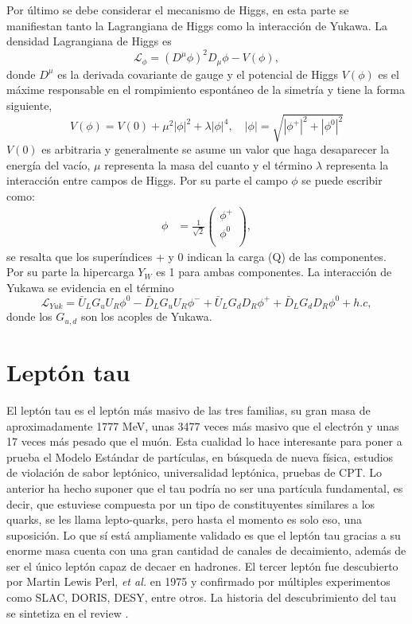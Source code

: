 Por último se debe considerar el mecanismo de Higgs, en esta parte se manifiestan tanto la Lagrangiana de Higgs como la interacción de Yukawa. La densidad Lagrangiana de Higgs es 
\begin{equation}
    \mathcal{L}_{\phi} = \left(D^\mu \phi\right)^2D_{\mu}\phi-V(\phi),
\end{equation}
donde \(D^{\mu}\) es la derivada covariante de gauge y el potencial de Higgs \(V(\phi)\) es el máxime responsable en el rompimiento espontáneo de la simetría y tiene la forma siguiente,
\begin{equation}
    V(\phi) = V(0)+\mu^2|\phi|^2+\lambda|\phi|^4, \quad |\phi| = \sqrt{|\phi^+|^2+|\phi^0|^2}
\end{equation}
\(V(0)\) es arbitraria y generalmente se asume un valor que haga desaparecer la energía del vacío, \(\mu\) representa la masa del cuanto y el término \(\lambda\) representa la interacción entre campos de Higgs. Por su parte el campo \(\phi\) se puede escribir como: 
\begin{align}
    \phi &= \frac{1}{\sqrt{2}} \begin{pmatrix}
           \phi^+ \\
           \phi^0 \\
         \end{pmatrix},
\end{align}
se resalta que los superíndices + y 0 indican la carga (Q) de las componentes. Por su parte la hipercarga \(Y_{W}\) es 1 para ambas componentes.
La interacción de Yukawa se evidencia en el término
\begin{equation}
    \mathcal{L}_{Yuk} = \bar{U}_{L}G_{u}U_{R}\phi^0-\bar{D}_{L}G_{u}U_{R}\phi^- +\bar{U}_{L}G_{d}D_{R}\phi^{+}+ \bar{D}_{L}G_{d}D_{R}\phi^0 +h.c,
\end{equation}
donde los \(G_{u,d}\) son los acoples de Yukawa.

\section{Leptón tau}

El leptón tau es el leptón más masivo de las tres familias, su gran masa de aproximadamente 1777 MeV, unas 3477 veces más masivo que el electrón y unas 17 veces más pesado que el muón. Esta
cualidad lo hace interesante para poner a prueba el Modelo Estándar de partículas, en búsqueda de nueva física, estudios de violación de sabor leptónico, universalidad leptónica, pruebas de CPT. Lo anterior ha hecho suponer que el tau podría no ser una partícula fundamental, es decir, que estuviese compuesta por un tipo de constituyentes similares a los quarks, se les llama lepto-quarks, pero hasta el momento es solo eso, una suposición. Lo que sí está ampliamente validado es que el leptón tau gracias  a su enorme masa cuenta con una gran cantidad de canales de decaimiento, además de ser el único leptón capaz de decaer en hadrones. El tercer leptón fue descubierto por Martin Lewis Perl, \textit{et al.} en 1975 y confirmado por múltiples experimentos como SLAC, DORIS, DESY, entre otros. La historia del descubrimiento del tau se sintetiza en el review \cite{Perl_1992}.

